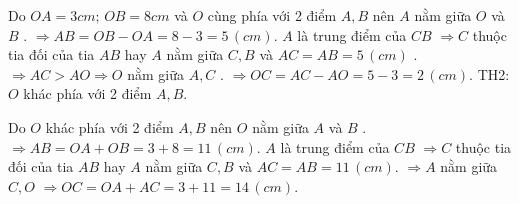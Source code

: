 Do  $OA=3cm;\,OB=8cm$  và  $O$ cùng phía với 2 điểm  $A,B$  nên  $A$  nằm giữa  $O$ và  $B$ .
 $\Rightarrow AB=OB-OA=8-3=5\,(cm).$ 
 $A$  là trung điểm của  $CB$  $\Rightarrow C$ thuộc tia đối của tia  $AB$  hay  $A$  nằm giữa  $C,B$ và  $AC=AB=5\,(cm)$ .
 $\Rightarrow AC>AO\Rightarrow O$  nằm giữa  $A,C$ .
 $\Rightarrow OC=AC-AO=5-3=2\,(cm).$ 
TH2:  $O$  khác phía với 2 điểm $A,B.$ 

Do  $O$  khác phía với 2 điểm  $A,B$  nên  $O$  nằm giữa  $A$  và  $B$ .
 $\Rightarrow AB=OA+OB=3+8=11\,(cm).$ 
 $A$  là trung điểm của  $CB$  $\Rightarrow C$ thuộc tia đối của tia  $AB$  hay  $A$  nằm giữa  $C,B$ và  $AC=AB=11\,(cm).$ 
 $\Rightarrow A$ nằm giữa  $C,O$  $\Rightarrow OC=OA+AC=3+11=14\,(cm).$ 







